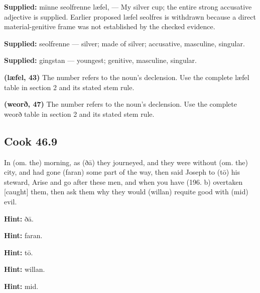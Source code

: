 \textbf{Supplied:} mīnne seolfrenne læfel, — My silver cup; the entire strong accusative adjective is supplied. Earlier proposed læfel seolfres is withdrawn because a direct material-genitive frame was not established by the checked evidence.

\textbf{Supplied:} seolfrenne — silver; made of silver; accusative, masculine, singular.

\textbf{Supplied:} gingstan — youngest; genitive, masculine, singular.

\textbf{(læfel, 43)} The number refers to the noun’s declension. Use the complete læfel table in section 2 and its stated stem rule.

\textbf{(weorð, 47)} The number refers to the noun’s declension. Use the complete weorð table in section 2 and its stated stem rule.

\par\begin{minipage}{\linewidth}\raggedright
\subsection*{Cook 46.9}

In (om. the) morning, as (ðā) they journeyed, and they were without (om. the) city, and had gone (faran) some part of the way, then said Joseph to (tō) his steward, Arise and go after these men, and when you have (196. b) overtaken [caught] them, then ask them why they would (willan) requite good with (mid) evil.

\textbf{Hint:} ðā.

\textbf{Hint:} faran.

\textbf{Hint:} tō.

\textbf{Hint:} willan.

\textbf{Hint:} mid.

\end{minipage}\par\addvspace{4pt}


